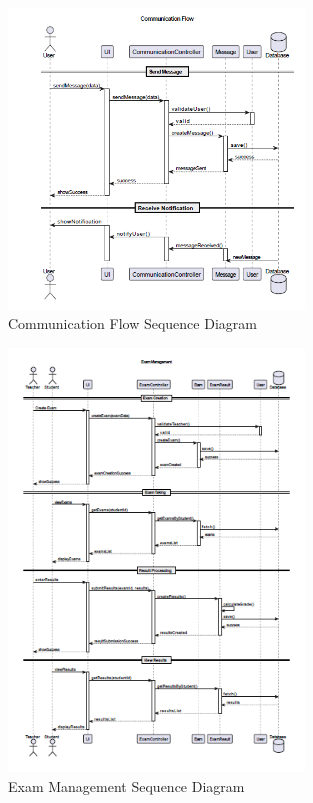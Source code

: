 \documentclass[12pt,a4paper]{report}
\begin{document}
\begin{figure}[htbp]
    \centering
    \includegraphics[width=0.7\textwidth]{communication-flow-sequence.png}
    \caption{Communication Flow Sequence Diagram}
    \label{fig:communication-flow-sequence}
\end{figure}

\begin{figure}[htbp]
    \centering
    \includegraphics[width=0.7\textwidth]{exam-management-sequence.png}
    \caption{Exam Management Sequence Diagram}
    \label{fig:exam-management-sequence}
\end{figure}
\end{document}
